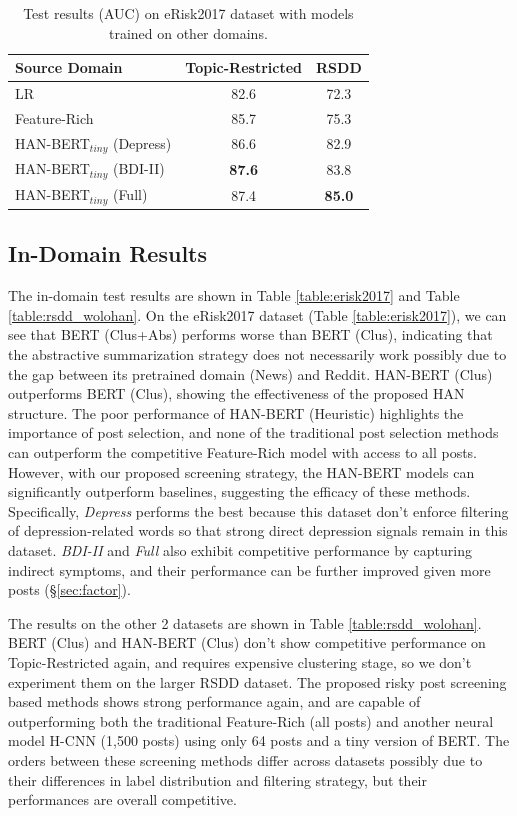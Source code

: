 \begin{table}[th]
    \centering
	\small
    \begin{tabular}{l|cc}
        \hline
        Source Domain & Topic-Restricted & RSDD \\
        \hline
        LR & 82.6 & 72.3 \\
        Feature-Rich & 85.7 & 75.3 \\
        \hline
        HAN-BERT$_{tiny}$ (Depress) & 86.6 & 82.9 \\
        HAN-BERT$_{tiny}$ (BDI-II) & \textbf{87.6} & 83.8 \\
        HAN-BERT$_{tiny}$ (Full) & 87.4 & \textbf{85.0} \\
        \hline
    \end{tabular}
    \caption{\label{table:cross} Test results (AUC) on eRisk2017 dataset with models trained on other domains.}
\end{table}

\subsection{In-Domain Results}
\label{sec:in-domain}

The in-domain test results are shown in Table \ref{table:erisk2017} and Table \ref{table:rsdd_wolohan}. On the eRisk2017 dataset (Table \ref{table:erisk2017}), we can see that BERT (Clus+Abs) performs worse than BERT (Clus), indicating that the abstractive summarization strategy does not necessarily work possibly due to the gap between its pretrained domain (News) and Reddit. HAN-BERT (Clus) outperforms BERT (Clus), showing the effectiveness of the proposed HAN structure. The poor performance of HAN-BERT (Heuristic) highlights the importance of post selection, and none of the traditional post selection methods can outperform the competitive Feature-Rich model with access to all posts. However, with our proposed screening strategy, the HAN-BERT models can significantly outperform baselines, suggesting the efficacy of these methods. Specifically, \textit{Depress} performs the best because this dataset don't enforce filtering of depression-related words so that strong direct depression signals remain in this dataset. \textit{BDI-II} and \textit{Full} also exhibit competitive performance by capturing indirect symptoms, and their performance can be further improved given more posts (\S \ref{sec:factor}). 

The results on the other 2 datasets are shown in Table \ref{table:rsdd_wolohan}. BERT (Clus) and HAN-BERT (Clus) don't show competitive performance on Topic-Restricted again, and requires expensive clustering stage, so we don't experiment them on the larger RSDD dataset. The proposed risky post screening based methods shows strong performance again, and are capable of outperforming both the traditional Feature-Rich (all posts) and another neural model H-CNN (1,500 posts) using only 64 posts and a tiny version of BERT. The orders between these screening methods differ across datasets possibly due to their differences in label distribution and filtering strategy, but their performances are overall competitive.

